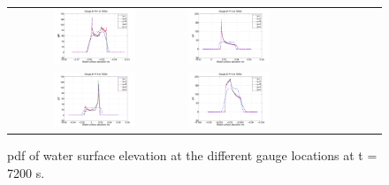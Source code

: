 \documentclass[review,12pt]{elsarticle}
\begin{document}
\begin{figure}[ht]
\centering

\begin{tabular}{clcl}
\includegraphics[width=0.5\textwidth]{Figure5a.pdf} &
\includegraphics[width=0.5\textwidth]{Figure5b.pdf} \\
\includegraphics[width=0.5\textwidth]{Figure5c.pdf} &
\includegraphics[width=0.5\textwidth]{Figure5d.pdf}
\end{tabular}
\caption{pdf of water surface elevation at the different gauge locations at t = 7200 s.}
\label{fig:pdfs2}
\end{figure}
\end{document}
